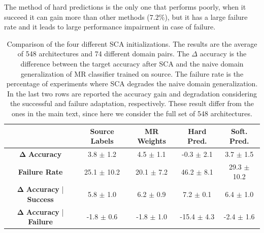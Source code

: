 \documentclass{article}
\begin{document}
The method of hard predictions is the only one that performs poorly, when it succeed it can gain more than other methods ($7.2\%$), but it has a large failure rate and it leads to large performance impairment in case of failure. 

\begin{table}[h]
\caption{Comparison of the four different SCA initializations. The results are the average of 548 architectures and 74 different domain pairs. The $\Delta$ accuracy is the difference between the target accuracy after SCA and the naive domain generalization of MR classifier trained on source. The failure rate is the percentage of experiments where SCA degrades the naive domain generalization. In the last two rows are reported the accuracy gain and degradation considering the successful and failure adaptation, respectively. These result differ from the ones in the main text, since here we consider the full set of 548 architectures.}

\label{comparison_sca}
\begin{center}
\begin{footnotesize}
\begin{tabular}{ccccc}

\toprule
 & \textbf{Source Labels} & \textbf{MR Weights} & \textbf{Hard Pred.} & \textbf{Soft. Pred.} \\
 \midrule
$\bm{\Delta}$ \textbf{Accuracy}& 3.8 $\pm$ \tiny{1.2} & 4.5 $\pm$ \tiny{1.1} & -0.3 $\pm$ \tiny{2.1} & 3.7 $\pm$ \tiny{1.5} \\
\textbf{\textbf{Failure Rate}} & 25.1 $\pm$ \tiny{10.2} & 20.1 $\pm$ \tiny{7.2} & 46.2 $\pm$ \tiny{8.1} & 29.3 $\pm$ \tiny{10.2} \\
 \midrule
$\bm{\Delta}$ \textbf{Accuracy} | \textbf{Success} & 5.8 $\pm$ \tiny{1.0} & 6.2 $\pm$ \tiny{0.9} & 7.2 $\pm$ \tiny{0.1} & 6.4 $\pm$ \tiny{1.0} \\
$\bm{\Delta}$ \textbf{Accuracy} | \textbf{Failure} & -1.8 $\pm$ \tiny{0.6} & -1.8 $\pm$ \tiny{1.0} & -15.4 $\pm$ \tiny{4.3} & -2.4 $\pm$ \tiny{1.6} \\
 \bottomrule
 
\end{tabular}
\end{footnotesize}
\end{center}
\end{table}


\end{document}
